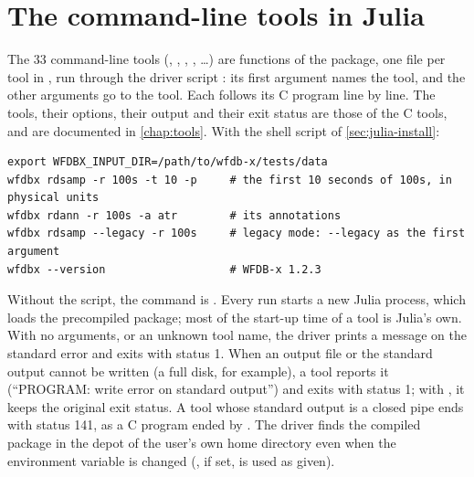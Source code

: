 \section{The command-line tools in Julia}
\label{sec:julia-tools}

The 33 command-line tools (, , , ,
\ldots) are functions of the package, one file per tool in , run
through the driver script : its first argument names the tool,
and the other arguments go to the tool. Each follows its C program line by line. The
tools, their options, their output and their exit status are those of the C tools, and
are documented in \cref{chap:tools}. With the shell script  of
\cref{sec:julia-install}:

\begin{lstlisting}[style=shell]
export WFDBX_INPUT_DIR=/path/to/wfdb-x/tests/data
wfdbx rdsamp -r 100s -t 10 -p     # the first 10 seconds of 100s, in physical units
wfdbx rdann -r 100s -a atr        # its annotations
wfdbx rdsamp --legacy -r 100s     # legacy mode: --legacy as the first argument
wfdbx --version                   # WFDB-x 1.2.3
\end{lstlisting}

Without the script, the command is .
Every run starts a new Julia process, which loads the precompiled package; most of the
start-up time of a tool is Julia's own. With no arguments, or an unknown tool name, the
driver prints a message on the standard error and exits with status 1. When an output
file or the standard output cannot be written (a full disk, for example), a tool reports
it (``PROGRAM: write error on standard output'') and exits with status 1; with
, it keeps the original exit status. A tool whose standard output is a
closed pipe ends with status 141, as a C program ended by . The driver finds
the compiled package in the depot of the user's own home directory even when the
environment variable  is changed (, if set, is used as
given).

